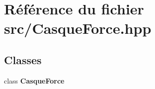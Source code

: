 \section{Référence du fichier src/\-Casque\-Force.hpp}
\label{_casque_force_8hpp}
\subsection*{Classes}
\begin{DoxyCompactItemize}
\item 
class {\bf Casque\-Force}
\end{DoxyCompactItemize}
